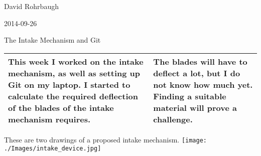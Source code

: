 David Rohrbaugh

2014-09-26

The Intake Mechanism and Git

\begin{tabular}{|p{5cm}|p{5cm}|}
 \hline
 This week I worked on the intake mechanism, as well as setting up Git on my laptop. I started to calculate the required deflection of the blades of the intake mechanism requires.
 &
 The blades will have to deflect a lot, but I do not know how much yet. Finding a suitable material will prove a challenge.
 \\
 \hline
\end{tabular}

These are two drawings of a proposed intake mechanism.
\texttt{[image: ./Images/intake\_device.jpg]}
